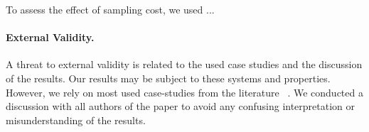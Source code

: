 To assess the effect of sampling cost, 
we used ...


\paragraph{External Validity.}
A threat to external validity is related to the used case studies and the discussion of the results.
Our results may be subject to these systems and properties. 
However, we rely on most used case-studies from the literature~\cite{julianasurvey} .
We conducted a discussion with all authors of the paper to avoid any confusing interpretation or misunderstanding of the results.

